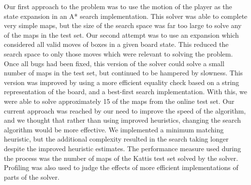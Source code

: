 \documentclass[a4paper,11pt]{article}
\begin{document}
Our first approach to the problem was to use the motion of the player as the
state expansion in an A* search implementation. This solver was able to complete
very simple maps, but the size of the search space was far too large to solve
any of the maps in the test set. Our second attempt was to use an expansion
which considered all valid moves of boxes in a given board state. This reduced
the search space to only those moves which were relevant to solving the
problem. Once all bugs had been fixed, this version of the solver could solve a
small number of maps in the test set, but continued to be hampered by
slowness. This version was improved by using a more efficient equality check
based on a string representation of the board, and a best-first search
implementation. With this, we were able to solve approximately 15 of the maps
from the online test set. Our current approach was reached by our need to
improve the speed of the algorithm, and we thought that rather than using
improved heuristics, changing the search algorithm would be more effective. We
implemented a minimum matching heuristic, but the additional complexity resulted
in the search taking longer despite the improved heuristic estimates. The
performance measure used during the process was the number of maps of the Kattis
test set solved by the solver. Profiling was also used to judge the effects of
more efficient implementations of parts of the solver.


\printbibliography
\end{document}
